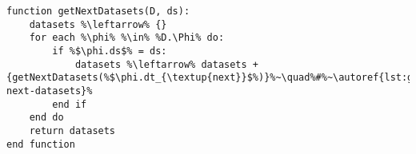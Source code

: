 \vfill{}

\begin{minipage}[c]{0.95\textwidth}
\begin{lstlisting}[language=pseudocode,label={lst:get-next-datasets-2},caption={[Obtenção dos próximos conjuntos de dados de um conjunto de dados]Obtenção dos próximos conjuntos de dados de um conjunto de dados.}]
function getNextDatasets(D, ds):
    datasets %\leftarrow% {}
    for each %\phi% %\in% %D.\Phi% do:
        if %$\phi.ds$% = ds:
            datasets %\leftarrow% datasets + {getNextDatasets(%$\phi.dt_{\textup{next}}$%)}%~\quad%#%~\autoref{lst:get-next-datasets}%
        end if
    end do
    return datasets
end function
\end{lstlisting}
\end{minipage}